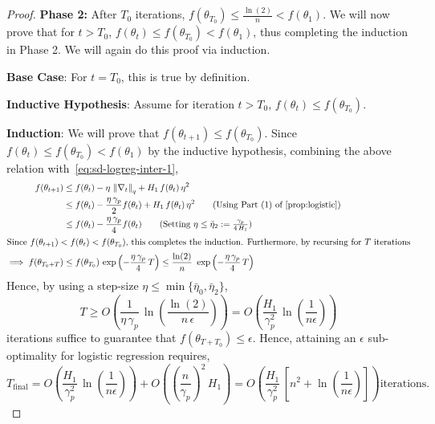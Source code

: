 \documentclass{article}
\newcommand{\norm}[1]{\left\|#1 \right\|}
\newcommand{\tht}{\theta_t}
\newcommand{\thtt}{\theta_{t+1}}
\begin{document}
\begin{proof}
\textbf{Phase 2:} After $T_0$ iterations, $f(\theta_{T_0}) \leq \frac{\ln(2)}{n} < f(\theta_1)$. We will now prove that for $t > T_0$, $f(\tht) \leq f(\theta_{T_0}) < f(\theta_1)$, thus completing the induction in Phase 2. We will again do this proof via induction. 

\textbf{Base Case}: For $t = T_0$, this is true by definition. 

\textbf{Inductive Hypothesis}: Assume for iteration $t > T_0$, $f(\tht) \leq f(\theta_{T_0})$.

\textbf{Induction}: We will prove that $f(\thtt) \leq f(\theta_{T_0})$. Since $f(\tht) \leq f(\theta_{T_0}) < f(\theta_1)$ by the inductive hypothesis, combining the above relation with~\cref{eq:sd-logreg-inter-1},
\begin{align*}
f(\thtt) & \leq f(\tht) - \eta \, \norm{\nabla_t}_q + H_1 \, f(\tht) \,\eta^2 \\
& \leq f(\tht) - \frac{\eta \, \gamma_p}{2} f(\tht) + H_1 \, f(\tht) \, \eta^2 \tag{Using Part (1) of~\cref{prop:logistic}} \\
& \leq f(\tht) - \frac{\eta \, \gamma_p}{4} f(\tht) \tag{Setting $\eta \leq \bar{\eta}_2 := \frac{\gamma_p}{4 \, H_1} $} \\
\intertext{Since $f(\thtt) < f(\tht) < f(\theta_{T_0})$, this completes the induction. Furthermore, by recursing for $T$ iterations}
\implies f(\theta_{T_0 + T}) & \leq f(\theta_{T_0}) \, \exp\left(-\frac{\eta \, \gamma_p}{4} \, T \right) \leq \frac{\ln(2)}{n} \, \, \exp\left(-\frac{\eta \, \gamma_p}{4} \, T \right) 
\end{align*}
Hence, by using a step-size $\eta \leq \min\{\bar{\eta}_0, \bar{\eta}_2\}$, 
\[
T \geq O \left( \frac{1}{\eta \, \gamma_p} \, \ln\left(\frac{\ln(2)}{n \, \epsilon} \right) \right) =  O \left( \frac{H_1}{\gamma_p^2} \, \ln\left(\frac{1}{n \epsilon}\right) \right)
\]
iterations suffice to guarantee that $f(\theta_{T + T_0}) \leq \epsilon$. Hence, attaining an $\epsilon$ sub-optimality for logistic regression requires, 
\[
T_{\text{final}} = O \left( \frac{H_1}{\gamma_p^2} \, \ln\left(\frac{1}{n \epsilon}\right) \right) + O \left( \left(\frac{n}{\gamma_p}\right)^2 \, H_1 \right) = O\left(\frac{H_1}{\gamma_p^2} \, \left[n^2 + \ln\left(\frac{1}{n \epsilon}\right)\right]\right) \text{iterations.}
\]
\end{proof}
\end{document}
